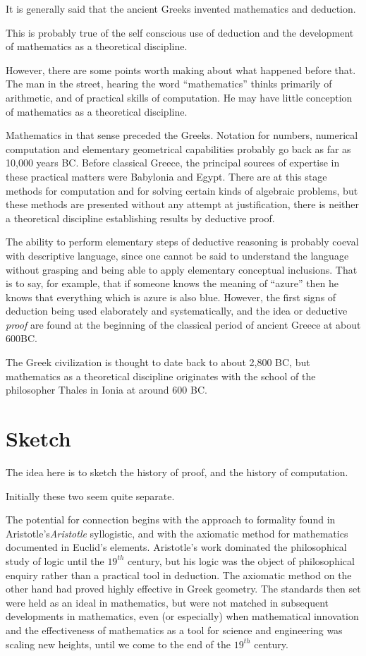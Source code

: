 It is generally said that the ancient Greeks invented mathematics and
deduction.

This is probably true of the self conscious use of deduction and the
development of mathematics as a theoretical discipline.

However, there are some points worth making about what happened before
that.
The man in the street, hearing the word ``mathematics'' thinks
primarily of arithmetic, and of practical skills of computation.
He may have little conception of mathematics as a theoretical
discipline.

Mathematics in that sense preceded the Greeks.
Notation for numbers, numerical computation and elementary
geometrical capabilities probably go back as far as 10,000
years BC.
Before classical Greece, the principal sources of expertise in these
practical matters were Babylonia and Egypt.
There are at this stage methods for computation and for solving
certain kinds of algebraic problems, but these methods are presented
without any attempt at justification, there is neither a theoretical
discipline establishing results by deductive proof.

The ability to perform elementary steps of deductive reasoning is
probably coeval with descriptive language, since one cannot be said to
understand the language without grasping and being able to apply
elementary conceptual inclusions.
That is to say, for example, that if someone knows the meaning of
``azure'' then he knows that everything which is azure is also blue.
However, the first signs of deduction being used elaborately and
systematically, and the idea or deductive \emph{proof} are found at
the beginning of the classical period of ancient Greece at about 600BC.

The Greek civilization is thought to date back to about 2,800 BC, but
mathematics as a theoretical discipline originates with the school of
the philosopher Thales in Ionia at around 600 BC.

\section{Sketch}

The idea here is to sketch the history of proof, and the history of computation.

Initially these two seem quite separate.

The potential for connection begins with the approach to formality
found in Aristotle's\emph{Aristotle} syllogistic, and with the axiomatic method for
mathematics documented in Euclid's elements.
Aristotle's work dominated the philosophical study of logic until the
$19^{th}$ century, but his logic was the object of philosophical
enquiry rather than a practical tool in deduction.
The axiomatic method on the other hand had proved highly effective in
Greek geometry.
The standards then set were held as an ideal in mathematics, but were
not matched in subsequent developments in mathematics, even (or
especially) when mathematical innovation and the effectiveness of
mathematics as a tool for science and engineering was scaling new
heights, until we come to the end of the $19^{th}$ century.

